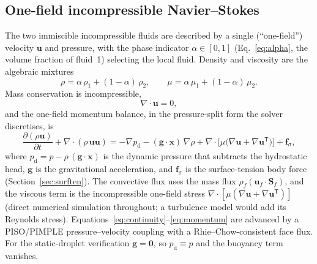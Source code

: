 \documentclass[preprint,3p,11pt]{elsarticle}
\newcommand{\uvec}{\mathbf{u}}
\begin{document}
\subsection{One-field incompressible Navier--Stokes}
\label{sec:ns}
The two immiscible incompressible fluids are described by a single (``one-field'')
velocity $\uvec$ and pressure, with the phase indicator $\alpha\in[0,1]$
(Eq.~\eqref{eq:alpha}, the volume fraction of fluid~1) selecting the local fluid.
Density and viscosity are the algebraic mixtures
\begin{equation}
  \rho = \alpha\,\rho_1 + (1-\alpha)\,\rho_2, \qquad
  \mu  = \alpha\,\mu_1  + (1-\alpha)\,\mu_2 .
  \label{eq:mixture}
\end{equation}
Mass conservation is incompressible,
\begin{equation}
  \nabla\cdot\uvec = 0,
  \label{eq:continuity}
\end{equation}
and the one-field momentum balance, in the pressure-split form the solver discretises, is
\begin{equation}
  \frac{\partial(\rho\uvec)}{\partial t} + \nabla\cdot(\rho\,\uvec\uvec)
  = -\nabla p_{\mathrm{d}} - (\mathbf{g}\cdot\mathbf{x})\,\nabla\rho
    + \nabla\cdot\!\bigl[\mu\bigl(\nabla\uvec + \nabla\uvec^{\mathsf T}\bigr)\bigr]
    + \mathbf{f}_\sigma,
  \label{eq:momentum}
\end{equation}
where $p_{\mathrm{d}}=p-\rho\,(\mathbf{g}\cdot\mathbf{x})$ is the dynamic pressure that
subtracts the hydrostatic head, $\mathbf{g}$ is the gravitational acceleration, and
$\mathbf{f}_\sigma$ is the surface-tension body force (Section~\ref{sec:surften}). The
convective flux uses the mass flux $\rho_f(\uvec_f\!\cdot\mathbf{S}_f)$, and the viscous
term is the incompressible one-field stress
$\nabla\cdot[\mu(\nabla\uvec+\nabla\uvec^{\mathsf T})]$ (direct numerical simulation
throughout; a turbulence model would add its Reynolds stress).
Equations~\eqref{eq:continuity}--\eqref{eq:momentum} are
advanced by a PISO/PIMPLE pressure--velocity coupling with a Rhie--Chow-consistent face
flux. For the static-droplet verification $\mathbf{g}=\mathbf 0$, so $p_{\mathrm{d}}\equiv p$
and the buoyancy term vanishes.
\end{document}
